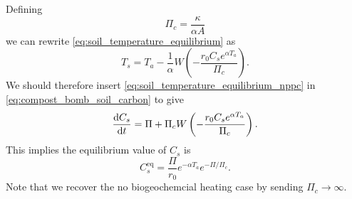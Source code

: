 Defining
\begin{equation}
  \label{eq:critical_npp}
  \Pi_c = \frac{\kappa}{\alpha A}
\end{equation}
we can rewrite \cref{eq:soil_temperature_equilibrium} as
\begin{equation}
  \label{eq:soil_temperature_equilibrium_nppc}
  T_s = T_a - \frac{1}{\alpha} W\left(-\frac{r_0C_s e^{\alpha T_a}}{\Pi_c} \right).
\end{equation}
We should therefore insert \cref{eq:soil_temperature_equilibrium_nppc} in \cref{eq:compost_bomb_soil_carbon}
to give
\begin{equation}
  \label{eq:soil_carbon_evolution}
  \dv{C_s}{t} = \Pi + \Pi_c W\left(-\frac{r_0C_s e^{\alpha T_a}}{\Pi_c} \right).
\end{equation}
This implies the equilibrium value of $C_s$ is
\begin{equation}
  \label{eq:equilibirum_soil_carbon}
  C_s^{\mathrm{eq}} = \frac{\Pi}{r_0} e^{-\alpha T_a} e^{-\Pi/\Pi_c}.
\end{equation}
Note that we recover the no biogeochemcial heating case by sending $\Pi_c \rightarrow \infty$.


